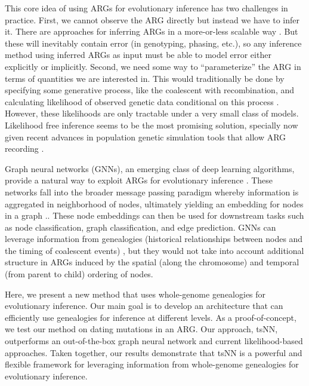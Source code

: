 This core idea of using ARGs for evolutionary inference has two challenges in practice. 
First, we cannot observe the ARG directly but instead we have to infer it. 
There are approaches for inferring ARGs in a more-or-less scalable way \citep{speidel_inferring_2021, kelleher_inferring_2019, zhang_biobank-scale_2023}. 
But these will inevitably contain error (\eg in genotyping, phasing, etc.),
so any inference method using inferred ARGs as input must be able to model error either explicitly or implicitly.
Second, we need some way to ``parameterize'' the ARG in terms of quantities we are interested in. 
This would traditionally be done by specifying some generative process, like the coalescent with recombination,
and calculating likelihood of observed genetic data conditional on this process \citep{fan_likelihood-based_2023}. 
However, these likelihoods are only tractable under a very small class of models. 
Likelihood free inference seems to be the most promising solution,
specially now given recent advances in population genetic simulation tools that allow ARG recording \citep{haller_tree-sequence_2019, kelleher_efficient_2016, ralph_efficiently_2020}. 

Graph neural networks (GNNs), an emerging class of deep learning algorithms, provide a natural way to exploit ARGs for evolutionary inference .
These networks fall into the broader message passing paradigm whereby information is aggregated in neighborhood of nodes,
ultimately yielding an embedding for nodes in a graph \citep{bronstein_geometric_2017, battaglia_relational_2018, hamilton_inductive_2018}..
These node embeddings can then be used for downstream tasks such as node classification, graph classification, and edge prediction.
GNNs can leverage information from genealogies (\ie historical relationships between nodes and the timing of coalescent events) \citep{korfmann_simultaneous_2023},
but they would not take into account additional structure in ARGs induced by the spatial (along the chromosome) and temporal (from parent to child) ordering of nodes.

Here, we present a new method that uses whole-genome genealogies for evolutionary inference.
Our main goal is to develop an architecture that can efficiently use genealogies for inference at different levels.
As a proof-of-concept, we test our method on dating mutations in an ARG.
Our approach, tsNN, outperforms an out-of-the-box graph neural network and current likelihood-based approaches.
Taken together, our results demonstrate that tsNN is a powerful and flexible framework for leveraging information from whole-genome genealogies for evolutionary inference.

